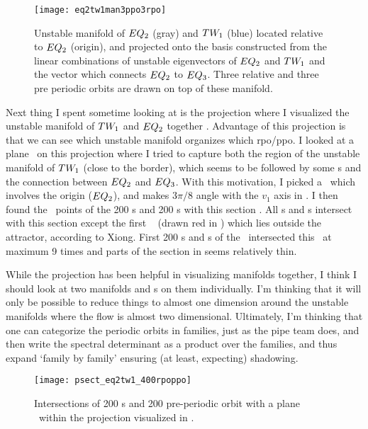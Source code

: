 \begin{description}
\begin{figure}[h]
  \centering
  \texttt{[image: eq2tw1man3ppo3rpo]}
  \caption{Unstable manifold of $EQ_{2}$ (gray) and $TW_{1}$ (blue) located
  relative to $EQ_{2}$   (origin), and projected onto the basis constructed from
  the linear combinations of unstable eigenvectors of $EQ_{2}$ and $TW_{1}$ and
  the vector which connects $EQ_{2}$ to $EQ_{3}$. Three relative and three pre
  periodic orbits are drawn on top of these manifold.}
  \label{f-eq2tw1man3ppo3rpo}
\end{figure}

Next thing I spent sometime looking at is the projection where I visualized
the unstable manifold of $TW_{1}$ and $EQ_{2}$ together
. Advantage of this projection is that we can see
which unstable manifold organizes which rpo/ppo. I looked at a plane
\PoincSec\ on this projection where I tried to capture both the region
of the unstable manifold of $TW_{1}$ (close to the border), which seems to be
followed by some \po s and the connection between $EQ_{2}$ and $EQ_{3}$. With this
motivation, I picked a \PoincSec\ which involves the origin ($EQ_{2}$),
and makes $3 \pi / 8$ angle with the $v_1$ axis in .
I then found the \PoincSec\ points of the 200 \rpo s and 200 \ppo s with this section
. All \rpo s and \ppo s intersect with this section
except the first \ppo\ \PPO{} (drawn red in ) which lies
outside the attractor, according to Xiong. First 200 \rpo s and \ppo s of the
\KS\ intersected this \PoincSec\ at maximum 9 times and parts of the
section in  seems relatively thin.

While the projection  has been helpful in
visualizing manifolds together, I think I should look at two manifolds and
\PoincSec s on them individually. I'm thinking that it will only be
possible to reduce things to almost one dimension around the unstable
manifolds where the flow is almost two dimensional. Ultimately, I'm thinking
that one can categorize the periodic orbits in families, just as the pipe
team does, and then write the spectral determinant as a product over the
families, and thus expand `family by family' ensuring (at least, expecting)
shadowing.

\begin{figure}[h]
  \centering
  \texttt{[image: psect\_eq2tw1\_400rpoppo]}
  \caption{Intersections of 200 \rpo s and 200 pre-periodic orbit with a plane
  \PoincSec\ within the projection visualized in
  .}
  \label{f-psect_eq2tw1_400rpoppo}
\end{figure}


\end{description}
